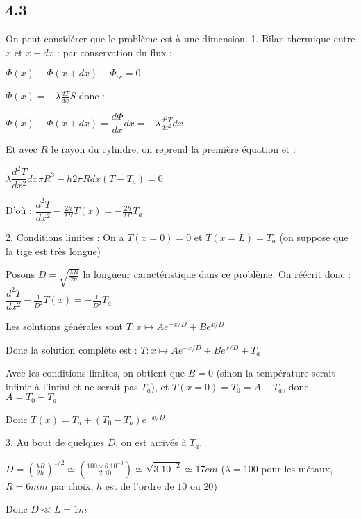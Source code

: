 \documentclass[a4paper,12pt]{book}
\begin{document}
\subsection{4.3}
On peut considérer que le problème est à une dimension.
1. Bilan thermique entre $x$ et $x+dx$ : par conservation du flux : \par $\Phi(x) - \Phi(x+dx)-\Phi_{cc}=0$ \par $\Phi(x) = -\lambda\frac{dT}{dx}S$ donc : \par $\Phi(x)-\Phi(x+dx) = \dfrac{d\Phi}{dx}dx=-\lambda\frac{d^2T}{dx^2}dx$ \par Et avec $R$ le rayon du cylindre, on reprend la première équation et : \par $\lambda\dfrac{d^2T}{dx^2}dx\pi R^3 - h2\pi Rdx(T-T_a)=0$ \par D'où : $\dfrac{d^2 T}{dx^2} - \frac{2h}{\lambda R}T(x) = -\frac{2h}{\lambda R}T_a$
\par 2. Conditions limites : On a $T(x=0)=0$ et $T(x=L)=T_a$ (on suppose que la tige est très longue) \par Posons $D=\sqrt{\frac{\lambda R}{2h}}$ la longueur caractéristique dans ce problème. On réécrit donc : $\dfrac{d^2 T}{dx^2} -\frac{1}{D^2}T(x)=-\frac{1}{D^2}T_a$ \par Les solutions générales sont $T:x\mapsto Ae^{-x/D}+Be^{x/D}$ \par Donc la solution complète est : $T:x\mapsto Ae^{-x/D}+Be^{x/D}+T_a$ \par Avec les conditions limites, on obtient que $B=0$ (sinon la température serait infinie à l'infini et ne serait pas $T_a$), et $T(x=0)=T_0=A+T_a$, donc $A=T_0-T_a$ \par Donc $T(x)=T_a+(T_0-T_a)e^{-x/D}$
\par 3. Au bout de quelques $D$, on est arrivés à $T_a$. \par $D=\left(\frac{\lambda R}{2h}\right)^{1/2}\simeq \left(\frac{100\times 6.10^{-3}}{2.10}\right)\simeq\sqrt{3.10^{-2}}\simeq 17cm$ ($\lambda=100$ pour les métaux, $R=6mm$ par choix, $h$ est de l'ordre de $10$ ou $20$) \par Donc $D\ll L=1m$
\end{document}
